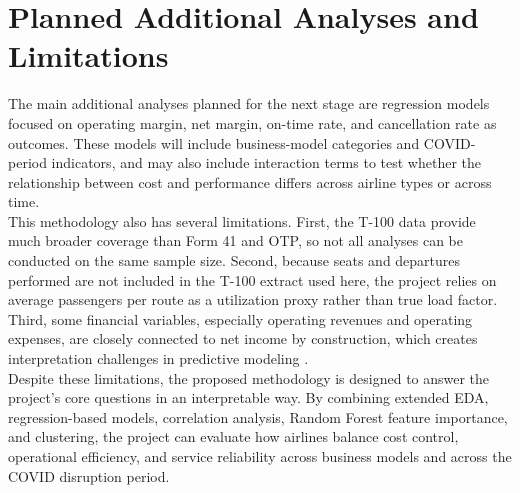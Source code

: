 \documentclass[11pt, letterpaper]{article}
\begin{document}
\section{Planned Additional Analyses and Limitations}
The main additional analyses planned for the next stage are regression models focused on operating margin, net margin, on-time rate, and cancellation rate as outcomes. These models will include business-model categories and COVID-period indicators, and may also include interaction terms to test whether the relationship between cost and performance differs across airline types or across time.\\
\indent This methodology also has several limitations. First, the T-100 data provide much broader coverage than Form 41 and OTP, so not all analyses can be conducted on the same sample size. Second, because seats and departures performed are not included in the T-100 extract used here, the project relies on average passengers per route as a utilization proxy rather than true load factor. Third, some financial variables, especially operating revenues and operating expenses, are closely connected to net income by construction, which creates interpretation challenges in predictive modeling \cite{banker1993, zuidberg2014}.\\
\indent Despite these limitations, the proposed methodology is designed to answer the project’s core questions in an interpretable way. By combining extended EDA, regression-based models, correlation analysis, Random Forest feature importance, and clustering, the project can evaluate how airlines balance cost control, operational efficiency, and service reliability across business models and across the COVID disruption period.



\end{document}
